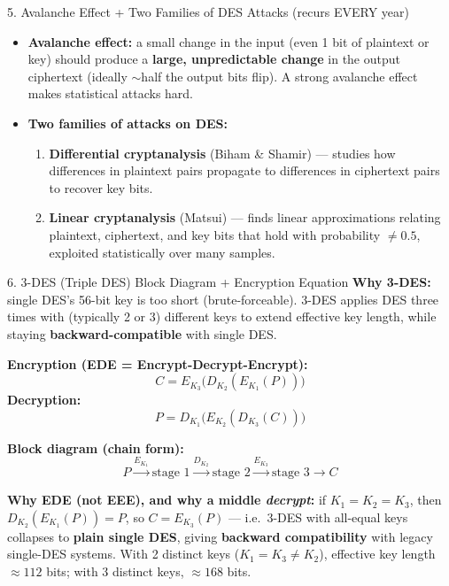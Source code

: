 \documentclass[12pt,a4paper]{article}
\begin{document}
\begin{algobox}{5. Avalanche Effect + Two Families of DES Attacks (recurs EVERY year)}
\begin{itemize}[noitemsep]
  \item \textbf{Avalanche effect:} a small change in the input (even 1 bit of plaintext or key) should produce a \textbf{large, unpredictable change} in the output ciphertext (ideally $\sim$half the output bits flip). A strong avalanche effect makes statistical attacks hard.
  \item \textbf{Two families of attacks on DES:}
  \begin{enumerate}[noitemsep]
    \item \textbf{Differential cryptanalysis} (Biham \& Shamir) --- studies how differences in plaintext pairs propagate to differences in ciphertext pairs to recover key bits.
    \item \textbf{Linear cryptanalysis} (Matsui) --- finds linear approximations relating plaintext, ciphertext, and key bits that hold with probability $\neq 0.5$, exploited statistically over many samples.
  \end{enumerate}
\end{itemize}
\end{algobox}

\begin{algobox}{6. 3-DES (Triple DES) Block Diagram + Encryption Equation}
\textbf{Why 3-DES:} single DES's 56-bit key is too short (brute-forceable). 3-DES applies DES three times with (typically 2 or 3) different keys to extend effective key length, while staying \textbf{backward-compatible} with single DES.

\textbf{Encryption (EDE = Encrypt-Decrypt-Encrypt):}
\[
C = E_{K_3}\big(D_{K_2}(E_{K_1}(P))\big)
\]
\textbf{Decryption:}
\[
P = D_{K_1}\big(E_{K_2}(D_{K_3}(C))\big)
\]

\textbf{Block diagram (chain form):}
\[
P \xrightarrow{E_{K_1}} \boxed{\text{stage 1}} \xrightarrow{D_{K_2}} \boxed{\text{stage 2}} \xrightarrow{E_{K_3}} \boxed{\text{stage 3}} \rightarrow C
\]

\textbf{Why EDE (not EEE), and why a middle \emph{decrypt}:} if $K_1=K_2=K_3$, then $D_{K_2}(E_{K_1}(P)) = P$, so $C = E_{K_3}(P)$ --- i.e.\ 3-DES with all-equal keys collapses to \textbf{plain single DES}, giving \textbf{backward compatibility} with legacy single-DES systems. With 2 distinct keys ($K_1=K_3 \neq K_2$), effective key length $\approx 112$ bits; with 3 distinct keys, $\approx 168$ bits.
\end{algobox}
\end{document}
